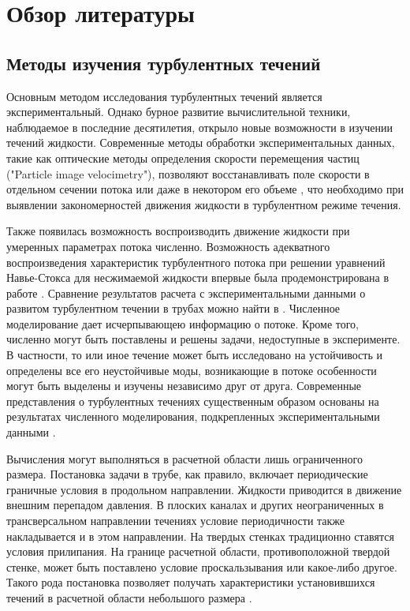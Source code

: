 \section{Обзор литературы}

	
	\subsection{Методы изучения турбулентных течений}

Основным методом исследования турбулентных течений является экспериментальный. Однако бурное развитие вычислительной техники, наблюдаемое в последние десятилетия, открыло новые возможности в изучении течений жидкости. Современные методы обработки экспериментальных данных, такие как оптические методы определения скорости перемещения частиц ("Particle image velocimetry"), позволяют восстанавливать поле скорости в отдельном сечении потока или даже в некотором его объеме \cite{PIVbook}, что необходимо при выявлении закономерностей движения жидкости в турбулентном режиме течения. 

Также появилась возможность воспроизводить движение жидкости при умеренных параметрах потока численно. Возможность адекватного воспроизведения характеристик турбулентного потока при решении уравнений Навье-Стокса для несжимаемой жидкости впервые была продемонстрирована в работе \cite{Kim1987}. Сравнение результатов расчета с экспериментальными данными о развитом турбулентном течении в трубах можно найти в \cite{Priymak1998, Nikitin2006}. Численное моделирование дает исчерпывающею информацию о потоке. Кроме того, численно могут быть поставлены и решены задачи, недоступные в эксперименте. В частности, то или иное течение может быть исследовано на устойчивость и определены все его неустойчивые моды, возникающие в потоке особенности могут быть выделены и изучены независимо друг от друга. Современные представления о турбулентных течениях существенным образом основаны на результатах численного моделирования, подкрепленных экспериментальными данными \cite{Manneville2015, Manneville2016}.

Вычисления могут выполняться в расчетной области лишь ограниченного размера. Постановка задачи в трубе, как правило, включает периодические граничные условия в продольном направлении. Жидкости приводится в движение внешним перепадом давления. В плоских каналах и других неограниченных в трансверсальном направлении течениях условие периодичности также накладывается и в этом направлении. На твердых стенках традиционно ставятся условия прилипания. На границе расчетной области, противоположной твердой стенке, может быть поставлено условие проскальзывания или какое-либо другое. Такого рода постановка позволяет получать характеристики установившихся течений в расчетной области небольшого размера \cite{Kim1987, Priymak1998, Nikitin2006}. 


